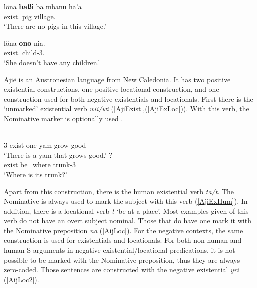 \begin{exe} \ex\label{NiaNegExist}
\begin{xlist} \ex \gll l\"ona \textbf{ba{\ss}i} ba mbanu ha'a\\
exist.\Neg{} pig \loc{} village.\mut{} \prox{}\\
\glt `There are no pigs in this village.'

\ex \gll l\"ona \textbf{ono}-nia.\\
exist.\Neg{} child-3\sg{}.\poss{}\\
\glt `She doesn't have any children.'
\end{xlist} 
\end{exe}


Aji\"e is an Austronesian language from New Caledonia. 
It has two positive existential constructions, one positive locational construction, and one construction used for both negative existentials and locationals.
First there is the `unmarked' existential verb \emph{wii/wi} (\ref{AjiExist},(\ref{AjiExLoc})).  
With this verb, the Nominative marker is optionally used \citep[109]{Lichtenberk:1978}.

\begin{exe}\ex{}
\begin{xlist}
\ex\label{AjiExist}\gll{}  \textbf{} \textbf{}   \\
3\sg{} exist one yam \relativ{} grow good\\
\glt `There is a yam that grows good.' 
\ex\label{AjiExLoc}\gll{}  \textbf{} \textbf{}?\\
exist be\_where \nom{} trunk-3\sg{}\\
\glt `Where is its trunk?' 
\end{xlist} 
\end{exe}

Apart from this construction, there is the human existential verb \emph{ta/t\textturnv}. 
The Nominative is always used to mark the subject with this verb (\ref{AjiExHum}). 
In addition, there is a locational verb \emph{t\textopeno} `be at a place'.
Most examples given of this verb do not have an overt subject nominal. 
Those that do have one mark it with the Nominative preposition \emph{na} (\ref{AijLoc}). 
For the negative contexts, the same construction is used for existentials and locationals.
For both non-human and human S arguments in negative existential/locational predications, it is not possible to be marked with the Nominative preposition, thus they are always zero-coded.
Those sentences are constructed with the negative existential \emph{y\textepsilon ri} (\ref{AijLoc2}). 

